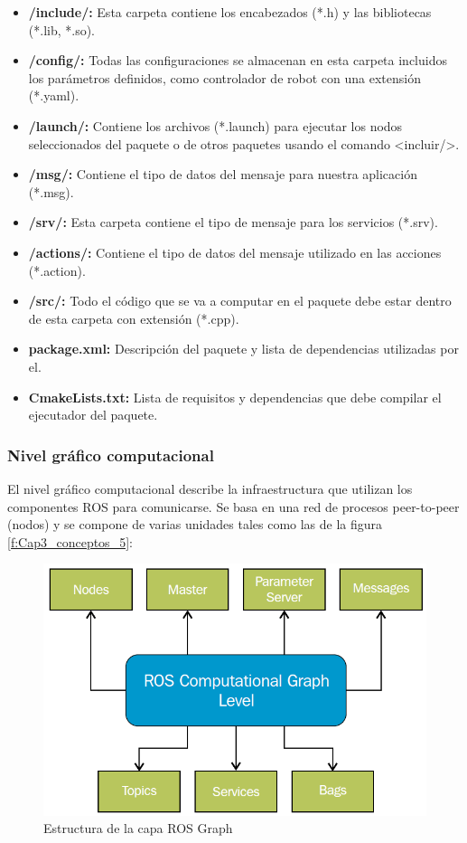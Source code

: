             \begin{itemize}
                \item {\textbf{/include/:} Esta carpeta contiene los encabezados (*.h) y las bibliotecas (*.lib, *.so).}
                \item {\textbf{/config/:} Todas las configuraciones se almacenan en esta carpeta incluidos los parámetros definidos, como controlador de robot con una extensión (*.yaml).}
                \item {\textbf{/launch/:} Contiene los archivos (*.launch) para ejecutar los nodos seleccionados del paquete o de otros paquetes usando el comando <incluir/>.}
                \item {\textbf{/msg/:} Contiene el tipo de datos del mensaje para nuestra aplicación (*.msg).}
                \item {\textbf{/srv/:} Esta carpeta contiene el tipo de mensaje para los servicios (*.srv).}
                \item {\textbf{/actions/:} Contiene el tipo de datos del mensaje utilizado en las acciones (*.action). }
                \item {\textbf{/src/:} Todo el código que se va a computar en el paquete debe estar dentro de esta carpeta con extensión (*.cpp).}
                \item {\textbf{package.xml:} Descripción del paquete y lista de dependencias utilizadas por el.}
                \item {\textbf{CmakeLists.txt:} Lista de requisitos y dependencias que debe compilar el ejecutador del paquete.}
            \end{itemize}

\newpage
            \subsubsection{Nivel gráfico computacional}
            
            El nivel gráfico computacional describe la infraestructura que utilizan los componentes ROS para comunicarse. Se basa en una red de procesos peer-to-peer (nodos) y se compone de varias unidades tales como las de la figura \eqref{f:Cap3_conceptos_5}:
            
            \begin{figure}[htb]
                \centering
                \includegraphics[width=0.63\linewidth]{Main/Chapter3/Images3/n_s_a_5.png}
                \caption{Estructura de la capa ROS Graph \cite{lentin_2015}}
                \label{f:Cap3_conceptos_5}
            \end{figure} 
            
